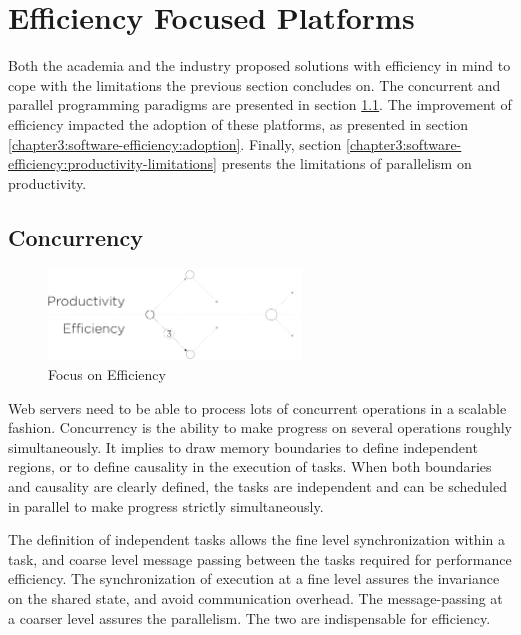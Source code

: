 \section{Efficiency Focused Platforms} \label{chapter3:software-efficiency}

Both the academia and the industry proposed solutions with efficiency in mind to cope with the limitations the previous section concludes on.
The concurrent and parallel programming paradigms are presented in section \ref{chapter3:software-efficiency:concurrency}.
The improvement of efficiency impacted the adoption of these platforms, as presented in section \ref{chapter3:software-efficiency:adoption}.
Finally, section \ref{chapter3:software-efficiency:productivity-limitations} presents the limitations of parallelism on productivity.

\subsection{Concurrency} \label{chapter3:software-efficiency:concurrency}

\begin{figure}[!h]
\begin{center}
\includegraphics[width=0.6\textwidth]{../resources/state-of-the-art-3.pdf}
\end{center}
\caption{Focus on Efficiency}
\label{fig:state-of-the-art-3}
\end{figure}

Web servers need to be able to process lots of concurrent operations in a scalable fashion.
Concurrency is the ability to make progress on several operations roughly simultaneously.
It implies to draw memory boundaries to define independent regions, or to define causality in the execution of tasks.
When both boundaries and causality are clearly defined, the tasks are independent and can be scheduled in parallel to make progress strictly simultaneously.

The definition of independent tasks allows the fine level synchronization within a task, and coarse level message passing between the tasks required for performance efficiency.
The synchronization of execution at a fine level assures the invariance on the shared state, and avoid communication overhead.
The message-passing at a coarser level assures the parallelism.
The two are indispensable for efficiency.

